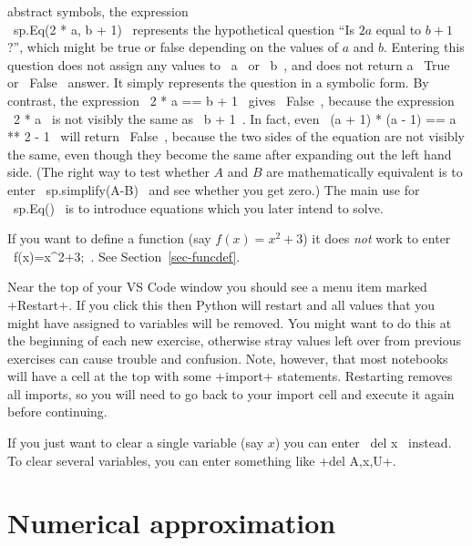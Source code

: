 \documentclass[a4paper,10pt]{amsbook}
\begin{document}
\begin{secenum}
\begin{itemize}
   abstract symbols, the expression\\ \pcode~sp.Eq(2 * a, b + 1)~
   represents the hypothetical question ``Is $2 a$ equal to $b + 1$?'',
   which might be true or false depending on the values of $a$ and
   $b$.  Entering this question does not assign any values to
   \pcode~a~ or \pcode~b~, and does not return a \pcode~True~ or
   \pcode~False~ answer.  It simply represents the question in a
   symbolic form.  By contrast, the expression \pcode~2 * a == b + 1~
   gives \pcode~False~, because the expression \pcode~2 * a~ is not
   visibly the same as \pcode~b + 1~.  In fact, even
   \pcode~(a + 1) * (a - 1) == a ** 2 - 1~ will return \pcode~False~,
   because the two sides of the equation are not visibly the same,
   even though they become the same after expanding out the left hand
   side.  (The right way to test whether $A$ and $B$ are
   mathematically equivalent is to enter \pcode~sp.simplify(A-B)~ and
   see whether you get zero.)  The main use for \pcode~sp.Eq()~ is to
   introduce equations which you later intend to solve.
 \end{itemize}
%
 \item\label{funcdef}
 If you want to define a function (say $f(x)=x^2+3$) it does
 \emph{not} work to enter \pcode~f(x)=x^2+3;~.  See
 Section~\ref{sec-funcdef}. 
%
 \item\label{restart}
  Near the top of your VS Code window you should see a menu item
  marked \pcode+Restart+.  If you click this then Python will restart
  and all values that you might have assigned to variables will be
  removed.  You might want to do this at the beginning of each new
  exercise, otherwise stray values left over from previous exercises
  can cause trouble and confusion.  Note, however, that most notebooks
  will have a cell at the top with some \pcode+import+ statements.
  Restarting removes all imports, so you will need to go back to your
  import cell and execute it again before continuing.
%
 \item\label{unassign}
  If you just want to clear a single variable (say $x$) you
  can enter \pcode~del x~ instead.  To clear several variables, you
  can enter something like \pcode+del A,x,U+.
\end{secenum}

\section{Numerical approximation}
\end{document}
